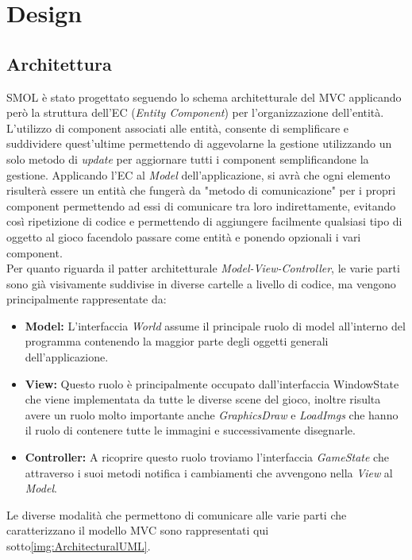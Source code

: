\documentclass[a4paper,12pt]{report}
\begin{document}
\chapter{Design}

\section{Architettura}
SMOL è stato progettato seguendo lo schema architetturale del \textsc{MVC} applicando però la struttura dell'\textsc{EC} 
(\emph{Entity Component}) per l'organizzazione dell'entità.
\\
L'utilizzo di component associati alle entità, consente di semplificare e suddividere quest'ultime permettendo di aggevolarne 
la gestione utilizzando un solo metodo di \emph{update} per aggiornare tutti i component semplificandone la gestione. 
Applicando l'\textsc{EC} al \emph{Model} dell'applicazione, si avrà che ogni elemento risulterà essere un entità che fungerà 
da "metodo di comunicazione" per i propri component permettendo ad essi di comunicare tra loro indirettamente, evitando così ripetizione 
di codice e permettendo di aggiungere facilmente qualsiasi tipo di oggetto al gioco facendolo passare come entità e ponendo 
opzionali i vari component.
\\
Per quanto riguarda il patter architetturale \emph{Model-View-Controller}, le varie parti sono già visivamente suddivise 
in diverse cartelle a livello di codice, ma vengono principalmente rappresentate da:
\begin{itemize}
    \item \textbf{Model:} L'interfaccia \emph{World} assume il principale ruolo di model all'interno del programma 
        contenendo la maggior parte degli oggetti generali dell'applicazione.
    \item \textbf{View:} Questo ruolo è principalmente occupato dall'interfaccia WindowState che viene implementata 
        da tutte le diverse scene del gioco, inoltre risulta avere un ruolo molto importante anche \emph{GraphicsDraw} e 
        \emph{LoadImgs} che hanno il ruolo di contenere tutte le immagini e successivamente disegnarle.
    \item \textbf{Controller:} A ricoprire questo ruolo troviamo l'interfaccia \emph{GameState} che attraverso i suoi metodi 
        notifica i cambiamenti che avvengono nella \emph{View} al \emph{Model}.
\end{itemize}
Le diverse modalità che permettono di comunicare alle varie parti che caratterizzano il modello \textsc{MVC} sono 
rappresentati qui sotto\ref{img:ArchitecturalUML}.
\end{document}
